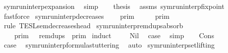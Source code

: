 \begin{isabellebody}
\ symrun{\isacharunderscore}interp{\isacharunderscore}expansion\ \isamarkupfalse%
\ simp\isanewline
\ \ \isamarkupfalse%
\ {\isacharquery}thesis\ \isamarkupfalse%
\ assms\ symrun{\isacharunderscore}interp{\isacharunderscore}fixpoint\ \isamarkupfalse%
\ fastforce\isanewline
{}\isamarkupfalse%
%
\endisatagproof
{\isafoldproof}%
%
\isadelimproof
\isanewline
%
\endisadelimproof
\isanewline
{}\isamarkupfalse%
\ symrun{\isacharunderscore}interp{\isacharunderscore}decreases{\isacharcolon}\isanewline
\ \ {\isacartoucheopen}{\isasymlbrakk}{\isasymlbrakk}\ {\isasymGamma}\ {\isasymrbrakk}{\isasymrbrakk}\isactrlsub p\isactrlsub r\isactrlsub i\isactrlsub m\ {\isasymsupseteq}\ {\isasymlbrakk}{\isasymlbrakk}\ {\isasymgamma}\ {\isacharhash}\ {\isasymGamma}\ {\isasymrbrakk}{\isasymrbrakk}\isactrlsub p\isactrlsub r\isactrlsub i\isactrlsub m{\isacartoucheclose}\isanewline
%
\isadelimproof
%
\endisadelimproof
%
\isatagproof
{}\isamarkupfalse%
\ {\isacharparenleft}rule\ TESL{\isacharunderscore}sem{\isacharunderscore}decreases{\isacharunderscore}head{\isacharparenright}%
\endisatagproof
{\isafoldproof}%
%
\isadelimproof
\isanewline
%
\endisadelimproof
\isanewline
{}\isamarkupfalse%
\ symrun{\isacharunderscore}interp{\isacharunderscore}remdups{\isacharunderscore}absorb{\isacharcolon}\isanewline
\ \ {\isacartoucheopen}{\isasymlbrakk}{\isasymlbrakk}\ {\isasymGamma}\ {\isasymrbrakk}{\isasymrbrakk}\isactrlsub p\isactrlsub r\isactrlsub i\isactrlsub m\ {\isacharequal}\ {\isasymlbrakk}{\isasymlbrakk}\ remdups\ {\isasymGamma}\ {\isasymrbrakk}{\isasymrbrakk}\isactrlsub p\isactrlsub r\isactrlsub i\isactrlsub m{\isacartoucheclose}\isanewline
%
\isadelimproof
%
\endisadelimproof
%
\isatagproof
{}\isamarkupfalse%
\ {\isacharparenleft}induct\ {\isasymGamma}{\isacharparenright}\isanewline
\ \ \isamarkupfalse%
\ Nil\ \isamarkupfalse%
\ {\isacharquery}case\ \isamarkupfalse%
\ simp\isanewline
{}\isamarkupfalse%
\isanewline
\ \ \isamarkupfalse%
\ Cons\isanewline
\ \ \ \ \isamarkupfalse%
\ {\isacharquery}case\ \isamarkupfalse%
\ symrun{\isacharunderscore}interp{\isacharunderscore}formula{\isacharunderscore}stuttering\ \isamarkupfalse%
\ auto\isanewline
{}\isamarkupfalse%
%
\endisatagproof
{\isafoldproof}%
%
\isadelimproof
\isanewline
%
\endisadelimproof
\isanewline
{}\isamarkupfalse%
\ symrun{\isacharunderscore}interp{\isacharunderscore}set{\isacharunderscore}lifting{\isacharcolon}\isanewline

\end{isabellebody}
